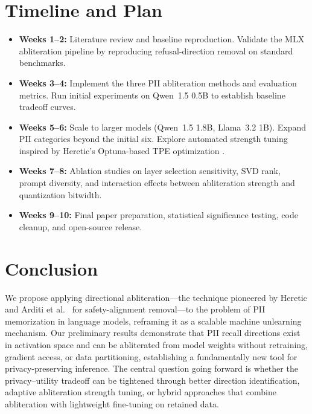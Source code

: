 \documentclass[11pt]{article}
\begin{document}
\section{Timeline and Plan}

\begin{itemize}
    \item \textbf{Weeks 1--2:} Literature review and baseline reproduction. Validate the MLX abliteration pipeline by reproducing refusal-direction removal on standard benchmarks.
    \item \textbf{Weeks 3--4:} Implement the three PII abliteration methods and evaluation metrics. Run initial experiments on Qwen~1.5 0.5B to establish baseline tradeoff curves.
    \item \textbf{Weeks 5--6:} Scale to larger models (Qwen~1.5 1.8B, Llama~3.2 1B). Expand PII categories beyond the initial six. Explore automated strength tuning inspired by Heretic's Optuna-based TPE optimization \citep{heretic2025}.
    \item \textbf{Weeks 7--8:} Ablation studies on layer selection sensitivity, SVD rank, prompt diversity, and interaction effects between abliteration strength and quantization bitwidth.
    \item \textbf{Weeks 9--10:} Final paper preparation, statistical significance testing, code cleanup, and open-source release.
\end{itemize}

\section{Conclusion}

We propose applying directional abliteration---the technique pioneered by Heretic \citep{heretic2025} and Arditi et al.\ \citep{arditi2024refusal} for safety-alignment removal---to the problem of PII memorization in language models, reframing it as a scalable machine unlearning mechanism. Our preliminary results demonstrate that PII recall directions exist in activation space and can be abliterated from model weights without retraining, gradient access, or data partitioning, establishing a fundamentally new tool for privacy-preserving inference. The central question going forward is whether the privacy--utility tradeoff can be tightened through better direction identification, adaptive abliteration strength tuning, or hybrid approaches that combine abliteration with lightweight fine-tuning on retained data.


\end{document}
